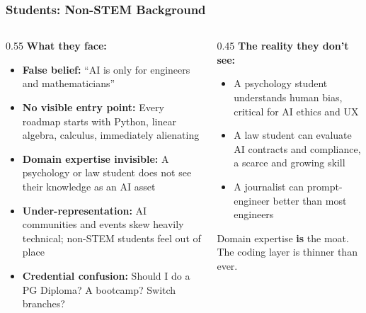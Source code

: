 \begin{frame}[fragile]\frametitle{Students: Non-STEM Background}

\begin{columns}
    \begin{column}[T]{0.55\linewidth}
\textbf{What they face:}
\begin{itemize}
\item \textbf{False belief:} ``AI is only for engineers and mathematicians''
\item \textbf{No visible entry point:} Every roadmap starts with Python, linear algebra, calculus, immediately alienating
\item \textbf{Domain expertise invisible:} A psychology or law student does not see their knowledge as an AI asset
\item \textbf{Under-representation:} AI communities and events skew heavily technical; non-STEM students feel out of place
\item \textbf{Credential confusion:} Should I do a PG Diploma? A bootcamp? Switch branches?
\end{itemize}
    \end{column}
    \begin{column}[T]{0.45\linewidth}
\textbf{The reality they don't see:}

\begin{itemize}
\item A psychology student understands human bias, critical for AI ethics and UX
\item A law student can evaluate AI contracts and compliance, a scarce and growing skill
\item A journalist can prompt-engineer better than most engineers
\end{itemize}

\vspace{0.2cm}
Domain expertise \textbf{is} the moat. The coding layer is thinner than ever.
    \end{column}
\end{columns}

\end{frame}


